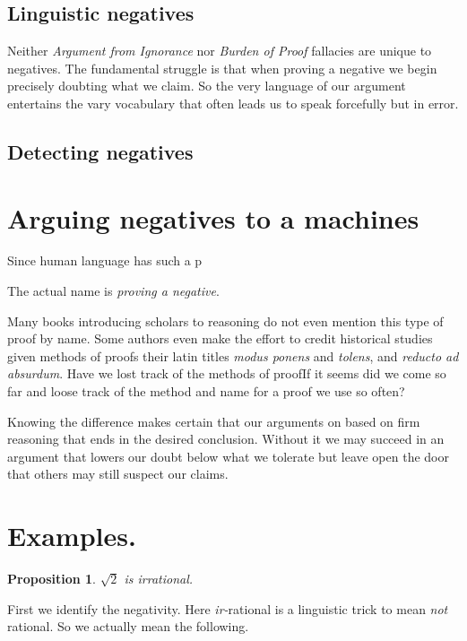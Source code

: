 \documentclass{amsart}
\newtheorem{prop}[thm]{Proposition}
\begin{document}
\subsection{Linguistic negatives}
Neither \emph{Argument from Ignorance} nor \emph{Burden of Proof} fallacies are
unique to negatives.  The fundamental struggle is that when proving a negative
we begin precisely doubting what we claim.  So the very language of our argument
entertains the vary vocabulary that often leads us to speak forcefully but in
error.





\subsection{Detecting negatives}

\section{Arguing negatives to a machines}
Since human language has such a p

The actual name is \emph{proving a negative}.

Many books introducing scholars to reasoning do not even mention this 
type of proof by name.  Some authors even make the effort to credit 
historical studies given methods of proofs their latin titles
\emph{modus ponens} and \emph{tolens}, and \emph{reducto ad 
absurdum}.  Have we lost track of the methods of proofIf it seems  did we come so far and loose track of the method 
and name for a proof we use so often?


Knowing the difference makes certain that our arguments on based 
on firm reasoning that ends in the desired conclusion.
Without it we may succeed in an argument that lowers our doubt 
below what we tolerate but leave open the door that others may 
still suspect our claims.





\section{Examples.}

\begin{prop}
   $\sqrt{2}$ is \emph{irrational}. 
\end{prop}
First we identify the negativity.  Here \emph{ir-}rational is a 
linguistic trick to mean \emph{not} rational.  So we actually mean the following.
\end{document}
